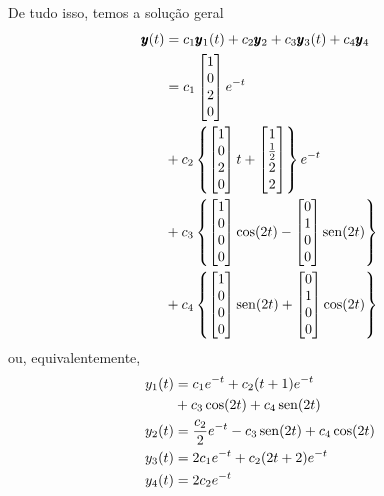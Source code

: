 \begin{resol}
  De tudo isso, temos a solução geral
  \begin{align}
    \pmb{y}(t) &= c_1\pmb{y}_1(t) + c_2\pmb{y}_2 + c_3\pmb{y}_3(t) + c_4\pmb{y}_4 \\
    &= c_1
      \begin{bmatrix}
        1 \\
        0 \\
        2 \\
        0
      \end{bmatrix}e^{-t} \\
    &+ c_2\left\{
      \begin{bmatrix}
        1 \\
        0 \\
        2 \\
        0
      \end{bmatrix}t +
    \begin{bmatrix}
      1 \\
      \frac{1}{2} \\
      2 \\
      2
    \end{bmatrix}\right\}e^{-t} \\
    &+ c_3\left\{
      \begin{bmatrix}
        1 \\
        0 \\
        0 \\
        0
      \end{bmatrix}\cos(2t) -
    \begin{bmatrix}
      0 \\ 1 \\ 0 \\ 0
    \end{bmatrix}\operatorname{sen}(2t)\right\} \\
    &+ c_4\left\{
      \begin{bmatrix}
        1 \\
        0 \\
        0 \\
        0
      \end{bmatrix}\operatorname{sen}(2t) +
    \begin{bmatrix}
      0 \\ 1 \\ 0 \\ 0
    \end{bmatrix}\cos(2t)\right\}
  \end{align}
  ou, equivalentemente,
  \begin{align}
    y_1(t) &= c_1e^{-t} + c_2(t + 1)e^{-t} \\
           &+ c_3\cos(2t) + c_4\operatorname{sen}(2t) \\
    y_2(t) &= \frac{c_2}{2}e^{-t} - c_3\operatorname{sen}(2t) + c_4\cos(2t) \\
    y_3(t) &= 2c_1e^{-t} + c_2(2t + 2)e^{-t} \\
    y_4(t) &= 2c_2e^{-t}
  \end{align}
\end{resol}

